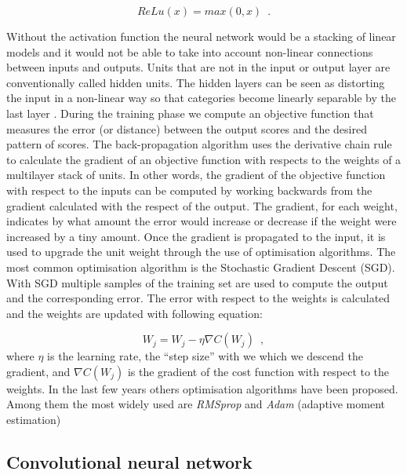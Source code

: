 \begin{equation}
    ReLu(x) = max(0,x)
    \enspace.
\end{equation}

Without the activation function the neural network would be a stacking of linear models and it would not be able to take into account non-linear connections between inputs and outputs. 
Units that are not in the input or output layer are conventionally called hidden units. The hidden layers can be seen as distorting the input in a non-linear way so that categories become linearly separable by the last layer \citep{DBLP:journals/nature/LeCunBH15}. During the training phase we compute an objective function that measures the error (or distance) between the output scores and the desired pattern of scores. The back-propagation algorithm uses the derivative chain rule to calculate the gradient of an objective function with respects to the weights of a multilayer stack of units. In other words, the gradient of the objective function with respect to the inputs can be computed by working backwards from the gradient calculated with the respect of the output. The gradient, for each weight, indicates by what amount the error would increase or decrease if the weight were increased by a tiny amount. Once the gradient is propagated to the input, it is used to upgrade the unit weight through the use of optimisation algorithms. The most common optimisation algorithm is the Stochastic Gradient Descent (SGD). With SGD multiple samples of the training set are used to compute the output and the corresponding error. The error with respect to the weights is calculated and the weights are updated with following equation:

\begin{equation}
    W_j = W_j - \eta\nabla C(W_j)
    \enspace,
\end{equation}
where $\eta$ is the learning rate, the “step size” with we which we descend the gradient, and $\nabla C(W_j)$ is the gradient of the cost function with respect to the weights.
In the last few years others optimisation algorithms have been proposed. Among them the most widely used are \textit{RMSprop} and \textit{Adam} (adaptive moment estimation) \citep{kingma2014adam}

\subsection{Convolutional neural network} \label{Convolutional Neural Network}

